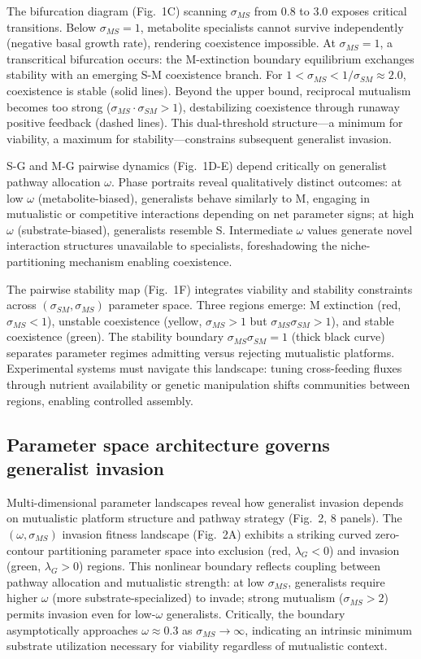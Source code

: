 \documentclass[9pt,twocolumn,twoside]{pnas-new}
\begin{document}
The bifurcation diagram (Fig.~1C) scanning $\sigma_{MS}$ from 0.8 to 3.0 exposes critical transitions. Below $\sigma_{MS} = 1$, metabolite specialists cannot survive independently (negative basal growth rate), rendering coexistence impossible. At $\sigma_{MS} = 1$, a transcritical bifurcation occurs: the M-extinction boundary equilibrium exchanges stability with an emerging S-M coexistence branch. For $1 < \sigma_{MS} < 1/\sigma_{SM} \approx 2.0$, coexistence is stable (solid lines). Beyond the upper bound, reciprocal mutualism becomes too strong ($\sigma_{MS} \cdot \sigma_{SM} > 1$), destabilizing coexistence through runaway positive feedback (dashed lines). This dual-threshold structure—a minimum for viability, a maximum for stability—constrains subsequent generalist invasion.

S-G and M-G pairwise dynamics (Fig.~1D-E) depend critically on generalist pathway allocation $\omega$. Phase portraits reveal qualitatively distinct outcomes: at low $\omega$ (metabolite-biased), generalists behave similarly to M, engaging in mutualistic or competitive interactions depending on net parameter signs; at high $\omega$ (substrate-biased), generalists resemble S. Intermediate $\omega$ values generate novel interaction structures unavailable to specialists, foreshadowing the niche-partitioning mechanism enabling coexistence.

The pairwise stability map (Fig.~1F) integrates viability and stability constraints across $(\sigma_{SM}, \sigma_{MS})$ parameter space. Three regions emerge: M extinction (red, $\sigma_{MS} < 1$), unstable coexistence (yellow, $\sigma_{MS} > 1$ but $\sigma_{MS}\sigma_{SM} > 1$), and stable coexistence (green). The stability boundary $\sigma_{MS}\sigma_{SM} = 1$ (thick black curve) separates parameter regimes admitting versus rejecting mutualistic platforms. Experimental systems must navigate this landscape: tuning cross-feeding fluxes through nutrient availability or genetic manipulation shifts communities between regions, enabling controlled assembly.

\subsection*{Parameter space architecture governs generalist invasion}

Multi-dimensional parameter landscapes reveal how generalist invasion depends on mutualistic platform structure and pathway strategy (Fig.~2, 8 panels). The $(\omega, \sigma_{MS})$ invasion fitness landscape (Fig.~2A) exhibits a striking curved zero-contour partitioning parameter space into exclusion (red, $\lambda_G < 0$) and invasion (green, $\lambda_G > 0$) regions. This nonlinear boundary reflects coupling between pathway allocation and mutualistic strength: at low $\sigma_{MS}$, generalists require higher $\omega$ (more substrate-specialized) to invade; strong mutualism ($\sigma_{MS} > 2$) permits invasion even for low-$\omega$ generalists. Critically, the boundary asymptotically approaches $\omega \approx 0.3$ as $\sigma_{MS} \to \infty$, indicating an intrinsic minimum substrate utilization necessary for viability regardless of mutualistic context.
\end{document}
